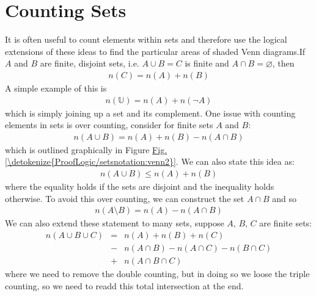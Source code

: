 \documentclass[letterpaper,10pt,english]{jupyterBook}
\begin{document}
\section{Counting Sets}
\label{\detokenize{ProofLogic/setsnotation:counting-sets}}
\sphinxAtStartPar
It is often useful to count elements within sets and therefore use the logical extensions of these ideas to find the particular areas of shaded Venn diagrams.If \(A\) and \(B\) are finite, disjoint sets, i.e. \(A \cup B = C\) is finite and \(A \cap B = \varnothing\), then
\begin{equation*}
\begin{split}n(C) = n(A) + n(B)\end{split}
\end{equation*}
\sphinxAtStartPar
A simple example of this is
\begin{equation*}
\begin{split}n(\mathbb{U}) = n(A) + n(\neg A)\end{split}
\end{equation*}
\sphinxAtStartPar
which is simply joining up a set and its complement. One issue with counting elements in sets is over counting, consider for finite sets \(A\) and \(B\):
\begin{equation*}
\begin{split}n(A \cup B) = n(A) + n(B) - n(A \cap B)\end{split}
\end{equation*}
\sphinxAtStartPar
which is outlined graphically in Figure \hyperref[\detokenize{ProofLogic/setsnotation:venn2}]{Fig.\@ \ref{\detokenize{ProofLogic/setsnotation:venn2}}}.  We can also state this idea as:
\begin{equation*}
\begin{split}n(A \cup B) \leq n(A) + n(B)\end{split}
\end{equation*}
\sphinxAtStartPar
where the equality holds if the sets are disjoint and the inequality holds otherwise.  To avoid this over counting, we can construct the set \(A \cap B\) and so
\begin{equation*}
\begin{split}n(A\setminus B) = n(A) - n(A \cap B)\end{split}
\end{equation*}
\sphinxAtStartPar
We can also extend these statement to many sets, suppose \(A,\,B,\,C\) are finite sets:
\begin{equation*}
\begin{split}n(A \cup B \cup C) &=& n(A) + n(B) + n(C) \\ &-&  n(A\cap B) - n(A\cap C) - n(B \cap C) \\ &+&  n(A \cap B \cap C)\end{split}
\end{equation*}
\sphinxAtStartPar
where we need to remove the double counting, but in doing so we loose the triple counting, so we need to re\sphinxhyphen{}add this total intersection at the end.
\end{document}

